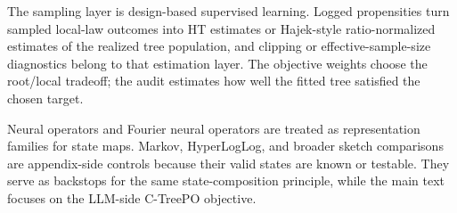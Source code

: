 The sampling layer is design-based supervised learning. Logged propensities
turn sampled local-law outcomes into HT estimates or Hajek-style
ratio-normalized estimates of the realized tree population, and clipping or
effective-sample-size diagnostics belong to that estimation layer. The
objective weights choose the root/local tradeoff; the audit estimates how well
the fitted tree satisfied the chosen target.

Neural operators and Fourier neural operators are treated as representation
families for state maps. Markov, HyperLogLog, and broader sketch comparisons
are appendix-side controls because their valid states are known or testable.
They serve as backstops for the same state-composition principle, while the
main text focuses on the LLM-side C-TreePO objective.
